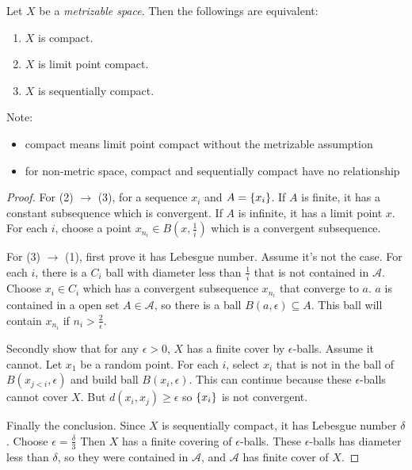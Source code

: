 \begin{theorem}
    Let $X$ be a \emph{metrizable space}. Then the followings are equivalent:
    \begin{enumerate}
        \item $X$ is compact.
        \item $X$ is limit point compact.
        \item $X$ is sequentially compact.
    \end{enumerate}
    
    Note:
    \begin{itemize}
        \item compact means limit point compact without the metrizable assumption
        \item for non-metric space, compact and sequentially compact have no relationship
    \end{itemize}
\end{theorem}
\begin{proof}
    For (2) $\rightarrow$ (3), for a sequence $x_i$ and $A = \set{x_i}$. If $A$ is finite, it has a constant subsequence which is convergent. If $A$ is infinite, it has a limit point $x$. For each $i$, choose a point $x_{n_i} \in B(x, \frac{1}{i})$ which is a convergent subsequence.
    
    For (3) $\rightarrow$ (1), first prove it has Lebesgue number. Assume it's not the case. For each $i$, there is a $C_i$ ball with diameter less than $\frac{1}{i}$ that is not contained in $\mathcal{A}$. Choose $x_i \in C_i$ which has a convergent subsequence $x_{n_i}$ that converge to $a$. $a$ is contained in a open set $A \in \mathcal{A}$, so there is a ball $B(a, \epsilon) \subseteq A$. This ball will contain $x_{n_i}$ if $n_i > \frac{2}{\epsilon}$.
    
    Secondly show that for any $\epsilon > 0$, $X$ has a finite cover by $\epsilon$-balls. Assume it cannot. Let $x_1$ be a random point. For each $i$, select $x_i$ that is not in the ball of $B(x_{j < i}, \epsilon)$ and build ball $B(x_i, \epsilon)$. This can continue because these $\epsilon$-balls cannot cover $X$. But $d(x_i, x_j) \geq \epsilon$ so $\set{x_i}$ is not convergent.
    
    Finally the conclusion. Since $X$ is sequentially compact, it has Lebesgue number $\delta$. Choose $\epsilon = \frac{\delta}{3}$ Then $X$ has a finite covering of $\epsilon$-balls. These $\epsilon$-balls has diameter less than $\delta$, so they were contained in $\mathcal{A}$, and $\mathcal{A}$ has finite cover of $X$.
\end{proof}


